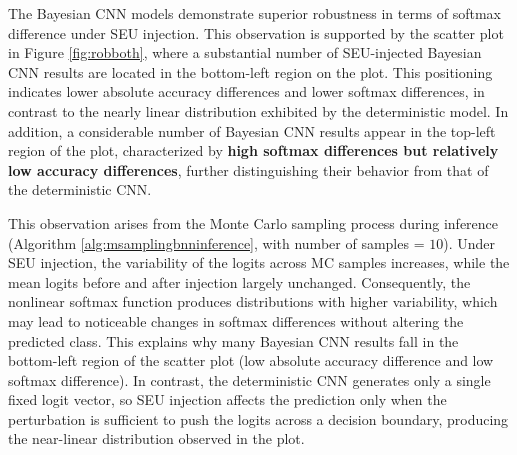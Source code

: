 \documentclass[ %
                    author={Revalda Putawara},
                supervisor={Dr. James Pope},
                    degree={MSc},
                     title={Robustness of Bayesian Neural Networks Design Choices Against Weight and Bias Perturbation Induced by Single Event Upsets (SEUs)},
                      type={},
                      year={2025}]{dissertation}
\begin{document}
The Bayesian CNN models demonstrate superior robustness in terms of softmax difference under SEU injection. This observation is supported by the scatter plot in Figure \ref{fig:robboth}, where a substantial number of SEU-injected Bayesian CNN results are located in the bottom-left region on the plot. This positioning indicates lower absolute accuracy differences and lower softmax differences, in contrast to the nearly linear distribution exhibited by the deterministic model. In addition, a considerable number of Bayesian CNN results appear in the top-left region of the plot, characterized by \textbf{high softmax differences but relatively low accuracy differences}, further distinguishing their behavior from that of the deterministic CNN.


This observation arises from the Monte Carlo sampling process during inference (Algorithm \ref{alg:msamplingbnninference}, with number of samples = $10$). Under SEU injection, the variability of the logits across MC samples increases, while the mean logits before and after injection largely unchanged. Consequently, the nonlinear softmax function produces distributions with higher variability, which may lead to noticeable changes in softmax differences without altering the predicted class. This explains why many Bayesian CNN results fall in the bottom-left region of the scatter plot (low absolute accuracy difference and low softmax difference). In contrast, the deterministic CNN generates only a single fixed logit vector, so SEU injection affects the prediction only when the perturbation is sufficient to push the logits across a decision boundary, producing the near-linear distribution observed in the plot.

\end{document}
